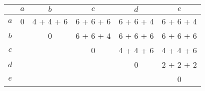 \documentclass{standalone}
\begin{document}
\begin{tabular}{c | c | c | c | c | c}
        & $a$  & $b$  & $c$  & $d$  & $e$  \\
    \hline
    $a$ & 0    & 4 + 4 + 6 & 6 + 6 + 6 & 6 + 6 + 4 & 6 + 6 + 4\\
    $b$ &      & 0         & 6 + 6 + 4 & 6 + 6 + 6 & 6 + 6 + 6\\
    $c$ &      &           & 0         & 4 + 4 + 6 & 4 + 4 + 6\\
    $d$ &      &           &           & 0         & 2 + 2 + 2\\
    $e$ &      &           &           &           & 0        \\
\end{tabular}
\end{document}
